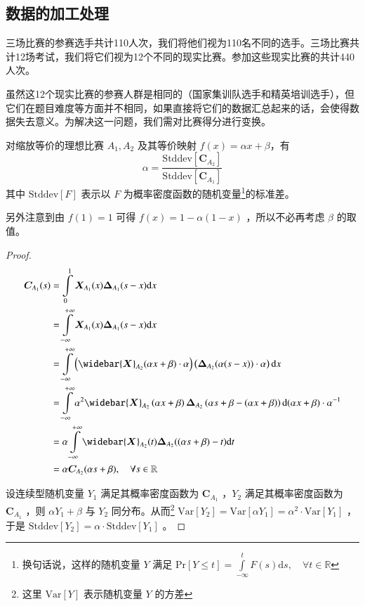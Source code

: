     \subsection{数据的加工处理}\label{sec:dataPreprocessingOfCTT}

        三场比赛的参赛选手共计110人次，我们将他们视为110名不同的选手。三场比赛共计12场考试，我们将它们视为12个不同的现实比赛。参加这些现实比赛的共计440人次。
        
        虽然这12个现实比赛的参赛人群是相同的（国家集训队选手和精英培训选手），但它们在题目难度等方面并不相同，如果直接将它们的数据汇总起来的话，会使得数据失去意义。为解决这一问题，我们需对比赛得分进行变换。

        \begin{proposition}
            对缩放等价的理想比赛 $A_1,A_2$ 及其等价映射 $f(x)=\alpha x+\beta$\nobreak，有
            $$
            \alpha=\frac{\mathrm{Stddev}\left[\bm{C}_{A_2}\right]}{\mathrm{Stddev}\left[\bm{C}_{A_1}\right]}
            $$
            其中 $\mathrm{Stddev}\left[F\right]$ 表示以 $F$ 为概率密度函数的随机变量\footnote{换句话说，这样的随机变量 $Y$ 满足 $\mathrm{Pr}\left[Y\leq t\right]=\int\limits_{-\infty}^t F(s)\mathrm{d}s,\quad\forall t\in\mathbb{R}$}的标准差。

            另外注意到由 $f(1)=1$ 可得 $f(x)=1-\alpha(1-x)$ ，所以不必再考虑 $\beta$ 的取值。
            \label{prop:alphaAsQuotientOfStddev}
        \end{proposition}

        \begin{proof}
            \begin{align*}
                \bm{C}_{A_1}(s)
                &=\int\limits_0^1 \bm{X}_{A_1}(x)\bm{\Delta}_{A_1}(s-x) \mathrm{d}x \\
                &=\int\limits_{-\infty}^{+\infty} \bm{X}_{A_1}(x)\bm{\Delta}_{A_1}(s-x) \mathrm{d}x \\
                &=\int\limits_{-\infty}^{+\infty} \left(\widebar{\bm{X}}_{A_2}(\alpha x+\beta)\cdot\alpha\right)\left(\bm{\Delta}_{A_2}(\alpha(s-x))\cdot\alpha\right) \mathrm{d}x\\
                &=\int\limits_{-\infty}^{+\infty} \alpha^2\widebar{\bm{X}}_{A_2}\left(\alpha x+\beta\right)\bm{\Delta}_{A_2}\left(\alpha s+\beta-\left(\alpha x+\beta\right)\right) \mathrm{d}(\alpha x+\beta)\cdot\alpha^{-1}\\
                &=\alpha\int\limits_{-\infty}^{+\infty} \widebar{\bm{X}}_{A_2}(t)\bm{\Delta}_{A_2}((\alpha s+\beta)-t)\mathrm{d} t\\
                &=\alpha\bm{C}_{A_2}(\alpha s+\beta),\quad\forall s\in\mathbb{R}
            \end{align*}

            设连续型随机变量 $Y_1$ 满足其概率密度函数为 $\bm{C}_{A_1}$ ，$Y_2$ 满足其概率密度函数为 $\bm{C}_{A_1}$ ，则 $\alpha Y_1+\beta$ 与 $Y_2$ 同分布。从而\footnote{这里 $\mathrm{Var}\left[Y\right]$ 表示随机变量 $Y$ 的方差} $\mathrm{Var}\left[Y_2\right]=\mathrm{Var}\left[\alpha Y_1\right]=\alpha^2\cdot\mathrm{Var}\left[Y_1\right]$ ，于是 $\mathrm{Stddev}\left[Y_2\right]=\alpha\cdot\mathrm{Stddev}\left[Y_1\right]$ 。
        \end{proof}

